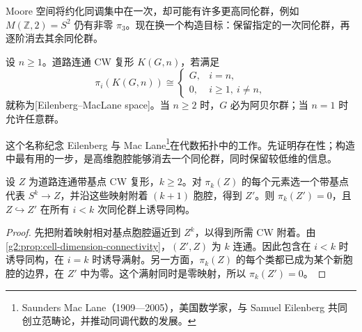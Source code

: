 Moore 空间将约化同调集中在一次，却可能有许多更高同伦群，例如 \(M(\mathbb Z,2)=S^2\) 仍有非零 \(\pi_3\)。现在换一个构造目标：保留指定的一次同伦群，再逐阶消去其余同伦群。

\begin{definition}\label{g2:def:eilenberg-maclane-space}
	设 \(n\ge1\)。道路连通 CW 复形 \(K(G,n)\)，若满足
	\[
		\pi_i(K(G,n))\cong
		\begin{cases}G,&i=n,\\0,&i\ge1,\ i\ne n,\end{cases}
	\]
	就称为[Eilenberg–MacLane space]。当 \(n\ge2\) 时，\(G\) 必为阿贝尔群；当 \(n=1\) 时允许任意群。
\end{definition}

这个名称纪念 Eilenberg 与 Mac Lane\footnote{Saunders Mac Lane（1909—2005），美国数学家，与 Samuel Eilenberg 共同创立范畴论，并推动同调代数的发展。}在代数拓扑中的工作。先证明存在性；构造中最有用的一步，是高维胞腔能够消去一个同伦群，同时保留较低维的信息。

\begin{lemma}\label{g2:lem:kill-homotopy-group}
	设 \(Z\) 为道路连通带基点 CW 复形，\(k\ge2\)。对 \(\pi_k(Z)\) 的每个元素选一个带基点代表 \(S^k\to Z\)，并沿这些映射附着 \((k+1)\) 胞腔，得到 \(Z'\)。则 \(\pi_k(Z')=0\)，且 \(Z\hookrightarrow Z'\) 在所有 \(i<k\) 次同伦群上诱导同构。
\end{lemma}
\begin{proof}
	先把附着映射相对基点胞腔逼近到 \(Z^k\)，以得到所需 CW 附着。由\cref{g2:prop:cell-dimension-connectivity}，\((Z',Z)\) 为 \(k\) 连通。因此包含在 \(i<k\) 时诱导同构，在 \(i=k\) 时诱导满射。另一方面，\(\pi_k(Z)\) 的每个类都已成为某个新胞腔的边界，在 \(Z'\) 中为零。这个满射同时是零映射，所以 \(\pi_k(Z')=0\)。
\end{proof}

